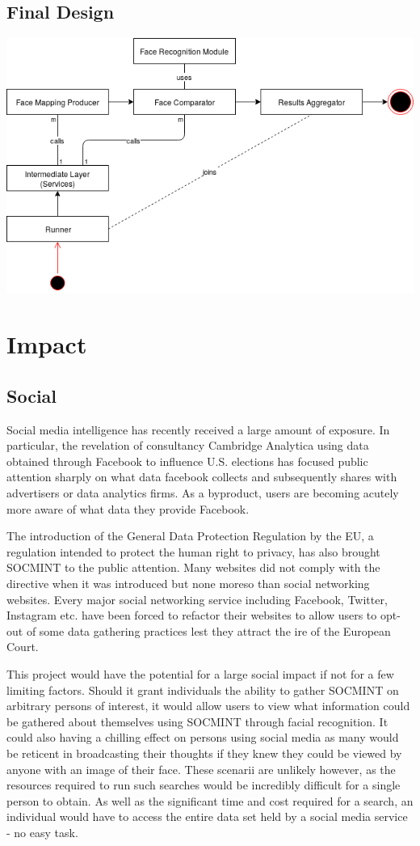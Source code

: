 \documentclass[12pt]{article}
\begin{document}
\subsection{Final Design}
\includegraphics[width=\linewidth]{res/final_design}

\newpage
\section{Impact}
\subsection{Social}
Social media intelligence has recently received a large amount of exposure. In particular, the revelation of consultancy Cambridge Analytica using data obtained through Facebook to influence U.S. elections has focused public attention sharply on what data facebook collects and subsequently shares with advertisers or data analytics firms. As a byproduct, users are becoming acutely more aware of what data they provide Facebook.

The introduction of the General Data Protection Regulation by the EU, a regulation intended to protect the human right to privacy, has also brought SOCMINT to the public attention. Many websites did not comply with the directive when it was introduced but none moreso than social networking websites. Every major social networking service including Facebook, Twitter, Instagram etc. have been forced to refactor their websites to allow users to opt-out of some data gathering practices lest they attract the ire of the European Court.

This project would have the potential for a large social impact if not for a few limiting factors. Should it grant individuals the ability to gather SOCMINT on arbitrary persons of interest, it would allow users to view what information could be gathered about themselves using SOCMINT through facial recognition. It could also having a chilling effect on persons using social media as many would be reticent in broadcasting their thoughts if they knew they could be viewed by anyone with an image of their face. These scenarii are unlikely however, as the resources required to run such searches would be incredibly difficult for a single person to obtain. As well as the significant time and cost required for a search, an individual would have to access the entire data set held by a social media service - no easy task.
\end{document}
